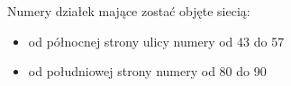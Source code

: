 	Numery działek mające zostać objęte siecią:
	\begin{itemize}
		\item od północnej strony ulicy numery od 43 do 57
		\item od południowej strony numery od 80 do 90
	\end{itemize}